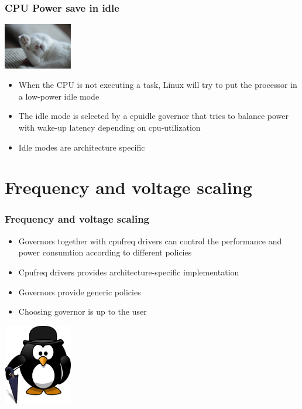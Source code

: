 \documentclass{beamer}
\begin{document}
\begin{frame}
\frametitle{CPU Power save in idle}
\begin{center}
\includegraphics[width=3cm]{media/catnap.jpg}
\end{center}
\begin{itemize}
	\item When the CPU is not executing a task, Linux will try to put the processor in a low-power idle mode
	\item The idle mode is selected by a cpuidle governor that tries to balance power with wake-up latency depending on cpu-utilization
	\item Idle modes are architecture specific 
\end{itemize}
\end{frame}

\section{Frequency and voltage scaling}

\begin{frame}
\frametitle{Frequency and voltage scaling}
\begin{itemize}
\item Governors together with cpufreq drivers can control the performance and power consumtion according to different policies
\item Cpufreq drivers provides architecture-specific implementation
\item Governors provide generic policies
\item Choosing governor is up to the user
\end{itemize}
\includegraphics[width=3cm]{media/tuxpolitician.png}
\end{frame}
\end{document}

